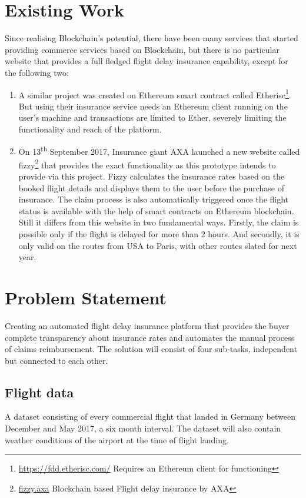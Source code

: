 \section{Existing Work}
Since realising Blockchain's potential, there have been many services that started providing commerce services based on Blockchain, but there is no particular website that provides a full fledged flight delay insurance capability, except for the following two:
\begin{enumerate}
    \item A similar project was created on Ethereum smart contract called Etherisc\footnote{\url{https://fdd.etherisc.com/} Requires an Ethereum client for functioning}. But using their insurance service needs an Ethereum client running on the user's machine and transactions are limited to Ether, severely limiting the functionality and reach of the platform.
    \item On 13\textsuperscript{th} September 2017, Insurance giant AXA launched a new website called fizzy\footnote{\url{fizzy.axa} Blockchain based Flight delay insurance by AXA} that provides the exact functionality as this prototype intends to provide via this project. Fizzy calculates the insurance rates based on the booked flight details and displays them to the user before the purchase of insurance. The claim process is also automatically triggered once the flight status is available with the help of smart contracts on Ethereum blockchain. Still it differs from this website in two fundamental ways. Firstly, the claim is possible only if the flight is delayed for more than 2 hours. And secondly, it is only valid on the routes from USA to Paris, with other routes slated for next year. \cite{AXAFizzy}
\end{enumerate}

\section{Problem Statement}
Creating an automated flight delay insurance platform that provides the buyer complete transparency about insurance rates and automates the manual process of claims reimbursement. The solution will consist of four sub-tasks, independent but connected to each other.
    \subsection{Flight data}
    A dataset consisting of every commercial flight that landed in Germany between December and May 2017, a six month interval. The dataset will also contain weather conditions of the airport at the time of flight landing.
